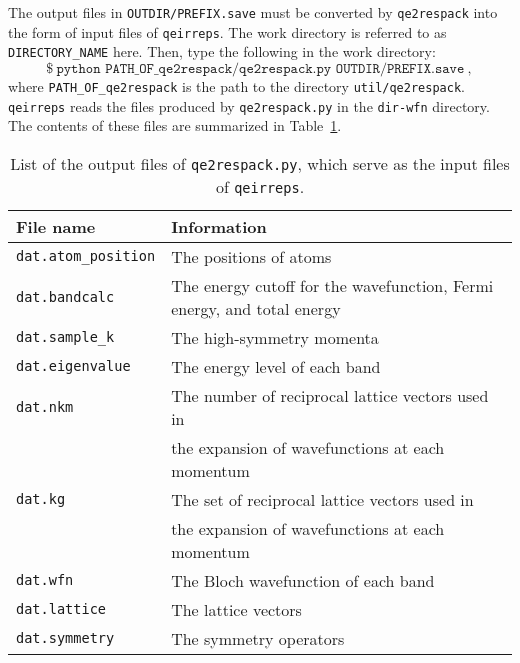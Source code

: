 \documentclass[3p,preprint]{elsarticle}
\begin{document}
The output files in \texttt{OUTDIR/PREFIX.save} must be converted by \texttt{qe2respack} into the form of input files of \texttt{qeirreps}. 
The work directory is referred to as \texttt{DIRECTORY\_NAME} here. Then, type the following in the work directory:
\begin{equation*}
\$\ \texttt{python PATH\_OF\_qe2respack/qe2respack.py OUTDIR/PREFIX.save}\ ,
\end{equation*}
where \texttt{PATH\_OF\_qe2respack} is the path to the directory \texttt{util/qe2respack}. \texttt{qeirreps} reads the files produced by \texttt{qe2respack.py} in the \texttt{dir-wfn} directory. The contents of these files are summarized in Table~\ref{tab:qe2respack}.

\begin{table}[htb]
	\caption{\label{tab:qe2respack}List of the output files of \texttt{qe2respack.py}, which serve as the input files of \texttt{qeirreps}.}
	\begin{center}
	\begin{tabular}{|l|l|} \hline
		File name & Information \\ \hline \hline
		\texttt{dat.atom\_position} & The positions of atoms \\ \hline
		\texttt{dat.bandcalc} & The energy cutoff for the wavefunction, Fermi energy, and total energy \\ \hline
		\texttt{dat.sample\_k} & The high-symmetry momenta \\ \hline
		\texttt{dat.eigenvalue} & The energy level of each band \\ \hline
		\texttt{dat.nkm} & The number of reciprocal lattice vectors used in  \\ &the expansion of wavefunctions at each momentum\\ \hline
		\texttt{dat.kg} & The set of reciprocal lattice vectors used in \\ & the expansion of wavefunctions at each momentum\\ \hline
		\texttt{dat.wfn} & The Bloch wavefunction of each band  \\ \hline
		\texttt{dat.lattice} & The lattice vectors \\ \hline
		\texttt{dat.symmetry} &The  symmetry operators \\ \hline		
	\end{tabular}
	\end{center}
\end{table}
\end{document}
